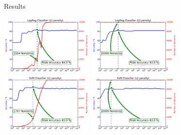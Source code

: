 \documentclass[10pt, aspectratio=169]{beamer} %
\begin{document}
\begin{frame}[fragile]{Results}
\begin{center}
	\includegraphics[width=0.35\textwidth]{ovarian_LogReg_l1.pdf}
	\includegraphics[width=0.35\textwidth]{ovarian_LogReg_l2.pdf}\\
	\includegraphics[width=0.35\textwidth]{ovarian_SVM_l1.pdf}
	\includegraphics[width=0.35\textwidth]{ovarian_SVM_l2.pdf}	
\end{center}
\end{frame}
\end{document}
